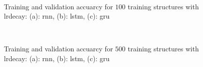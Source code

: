 \documentclass[conference]{IEEEtran}
\begin{document}
\begin{figure}[htp]
	\centering
	\quad
	\\
	\caption{Training and validation accuarcy for $ 100 $ training structures with \gls{lrdecay}: (a): \gls{rnn}, (b): \gls{lstm}, (c): \gls{gru}}
	\label{fig:accuracy_100_structures_fine_tuning_rnn}
\end{figure}


\begin{figure}[htp]
	\centering
	\quad
	\\
	\caption{Training and validation accuarcy for $ 500 $ training structures with \gls{lrdecay}: (a): \gls{rnn}, (b): \gls{lstm}, (c): \gls{gru}}
	\label{fig:accuracy_500_structures_fine_tuning_rnn}
\end{figure}
\end{document}
